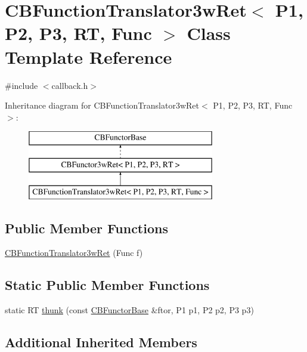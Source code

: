 \hypertarget{class_c_b_function_translator3w_ret}{\section{C\+B\+Function\+Translator3w\+Ret$<$ P1, P2, P3, R\+T, Func $>$ Class Template Reference}
\label{class_c_b_function_translator3w_ret}
}


{\ttfamily \#include $<$callback.\+h$>$}

Inheritance diagram for C\+B\+Function\+Translator3w\+Ret$<$ P1, P2, P3, R\+T, Func $>$\+:\begin{figure}[H]
\begin{center}
\leavevmode
\includegraphics[height=3.000000cm]{class_c_b_function_translator3w_ret}
\end{center}
\end{figure}
\subsection*{Public Member Functions}
\begin{DoxyCompactItemize}
\item 
\hyperlink{class_c_b_function_translator3w_ret_ac2b6449f80ddab6b24af1d17bf7c7453}{C\+B\+Function\+Translator3w\+Ret} (Func f)
\end{DoxyCompactItemize}
\subsection*{Static Public Member Functions}
\begin{DoxyCompactItemize}
\item 
static R\+T \hyperlink{class_c_b_function_translator3w_ret_a05ba9d1d3e8224bf08097b8dfe9f93cf}{thunk} (const \hyperlink{class_c_b_functor_base}{C\+B\+Functor\+Base} \&ftor, P1 p1, P2 p2, P3 p3)
\end{DoxyCompactItemize}
\subsection*{Additional Inherited Members}


